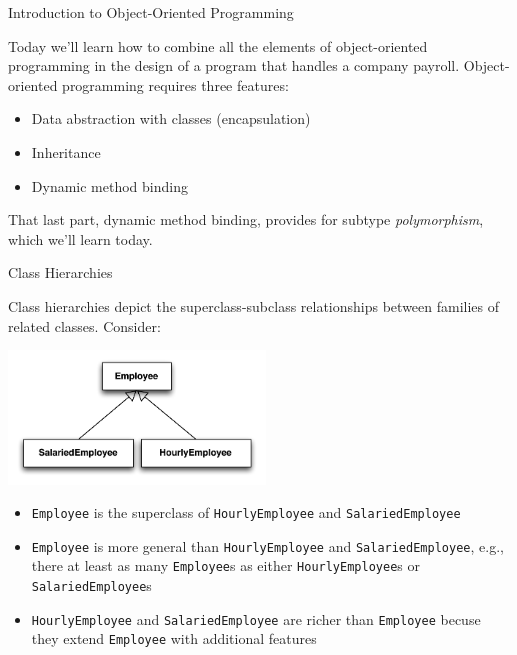 \documentclass{beamer}
\begin{document}
\begin{frame}
  \titlepage
\end{frame}

\begin{frame}[fragile]{Introduction to Object-Oriented Programming}


Today we'll learn how to combine all the elements of object-oriented programming in the design of a program that handles a company payroll.  Object-oriented programming requires three features:
\begin{itemize}
\item Data abstraction with classes (encapsulation)
\item Inheritance
\item Dynamic method binding
\end{itemize}

That last part, dynamic method binding, provides for subtype {\it polymorphism}, which we'll learn today.

\end{frame}

\begin{frame}[fragile]{Class Hierarchies}

\vspace{-.05in}
Class hierarchies depict the superclass-subclass relationships between families of related classes.  Consider:
\vspace{-.05in}
\begin{center}
\includegraphics[height=1.4in]{employee-class-hierarchy.pdf}
\end{center}
\vspace{-.2in}
\begin{itemize}
\item {\tt Employee} is the superclass of {\tt HourlyEmployee} and {\tt SalariedEmployee}
\item {\tt Employee} is more general than {\tt HourlyEmployee} and {\tt SalariedEmployee}, e.g., there at least as many {\tt Employee}s as either {\tt HourlyEmployee}s or {\tt SalariedEmployee}s
\item {\tt HourlyEmployee} and {\tt SalariedEmployee} are richer than {\tt Employee} becuse they extend {\tt Employee} with additional features
\end{itemize}


\end{frame}
\end{document}
